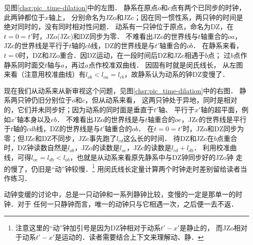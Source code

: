 见图\ref{chsr:pic_time-dilation}中的左图．
静系在原点$o$和$c$点有两个已同步的时钟，此两钟都位于$x$轴上，
分别命名为JZo和JZc；因在同一惯性系，两只钟的时间是绝对同时的，没有同时相对性问题．
动系有一只钟位于原点，命名为DZ，在$t=0=t'$时，JZo(JZc)和DZ同步为零．
不难看出JZo的世界线与$t$轴重合的$oa$，JZc的世界线是平行于$t$轴的$cb$线，DZ的世界线是与$t'$轴重合的$ob$．
在静系来看，$t=0$时，DZ和JZo重合．因DZ运动，在一段时间后DZ和JZc相遇于$b$点；
过$b$点作静系同时面交$t$轴与$a$，再过$a$点作校准双曲线．
因固有时就是闵氏线长，
从左图来看（注意用校准曲线）有$l_{ob}<l_{oa}=l_{cb}$，故静系认为动系的钟DZ变慢了．

现在我们从动系来从新审视这个问题，见图\ref{chsr:pic_time-dilation}中的右图．
静系两只钟仍旧分别位于$o$和$c$，但从动系来看，
这两只钟处于异地，同时是相对的，它们并未同步好；因为动系的同时面是垂直于$t'$轴、
平行于$x'$轴的超平面，例如$x'$轴本身以及$eb$．
不难看出JZo的世界线是与$t$轴重合的$oe$，JZc的世界线是平行于$t$轴的$cdb$线，DZ的世界线是与$t'$轴重合的$ob$．
在$t=0=t'$时，JZo和DZ同步为零；但JZc和DZ不同步，JZc事先跑了$l_{cd}$这么长的时间．
待DZ和JZc在$b$点重合时，DZ钟读数自然是$l_{ob}$，JZo的读数是$l_{oe}$，JZc的读数是$l_{cd}+l_{db}$．
利用校准曲线，可得$l_{oe}=l_{db}<l_{ob}$，也就是从动系来看原先静系中与DZ钟同步好的JZo钟
走的慢了，仍旧是“动”钟较慢．{\footnote{注意这里的“动”钟加引号是因为DZ钟相对于动系$t'-x'$是静止的，
而JZo相对于动系$t'-x'$是运动的．读者需要结合上下文来理解动、静．}}
用闵氏线长定量计算两个时钟走时差别留给读者当作练习．

动钟变缓的讨论中，总是一只动钟和一系列静钟比较，变慢的一定是那单一的时钟．对于
任何一只静钟而言，唯一的动钟只与它相遇一次，之后便一去不返．

